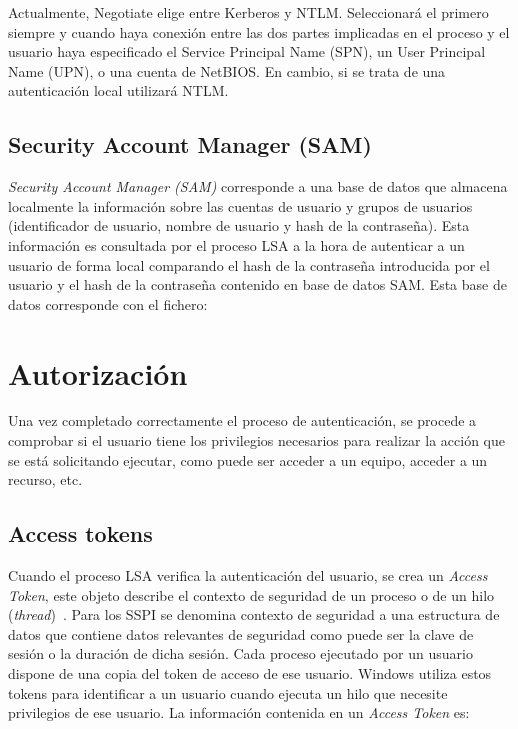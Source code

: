 Actualmente, Negotiate elige entre Kerberos y NTLM. Seleccionará el primero siempre y cuando haya conexión entre las dos partes implicadas en el proceso y el usuario haya especificado el Service Principal Name (SPN), un User Principal Name (UPN), o una cuenta de NetBIOS. En cambio, si se trata de una autenticación local utilizará NTLM.

\subsection{Security Account Manager (SAM)}

{\it Security Account Manager (SAM)} corresponde a una base de datos que almacena localmente la información sobre las cuentas de usuario y grupos de usuarios (identificador de usuario, nombre de usuario y hash de la contraseña). Esta información es consultada por el proceso LSA a la hora de autenticar a un usuario de forma local comparando el hash de la contraseña introducida por el usuario y el hash de la contraseña contenido en base de datos SAM. Esta base de datos corresponde con el fichero: 

\begin{listing}[style=consola, numbers=none]
\end{listing}

\section{Autorización}

Una vez completado correctamente el proceso de autenticación, se procede a comprobar si el usuario tiene los privilegios necesarios para realizar la acción que se está solicitando ejecutar, como puede ser acceder a un equipo, acceder a un recurso, etc. 


\subsection{Access tokens}

Cuando el proceso LSA verifica la autenticación del usuario, se crea un {\it Access Token}, este objeto describe el contexto de seguridad de un proceso o de un hilo ({\it thread})~\cite{Capitulo2:Access-Token}. Para los SSPI se denomina contexto de seguridad a una estructura de datos que contiene datos relevantes de seguridad como puede ser la clave de sesión o la duración de dicha sesión. Cada proceso ejecutado por un usuario dispone de una copia del token de acceso de ese usuario. Windows utiliza estos tokens para identificar a un usuario cuando ejecuta un hilo que necesite privilegios de ese usuario. La información contenida en un {\it Access Token} es:

